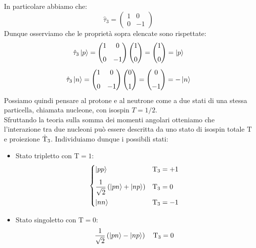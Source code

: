 In particolare abbiamo che:
\begin{equation}
 \hat{\tau}_3 = \begin{pmatrix}
  1 & 0 \\[8pt]
  0 & -1
  \end{pmatrix}
\end{equation}
Dunque osserviamo che le proprietà sopra elencate sono rispettate:
\begin{equation}
  \hat{\tau}_3 \ket{p} = \begin{pmatrix}
  1 & 0 \\[8pt]
  0 & -1
  \end{pmatrix} \begin{pmatrix}
  1 \\[8pt]
  0
  \end{pmatrix} = \begin{pmatrix}
  1 \\[8pt]
  0
  \end{pmatrix} = \ket{p}
\end{equation}
\begin{equation}
  \hat{\tau}_3 \ket{n} = \begin{pmatrix}
  1 & 0 \\[8pt]
  0 & -1
  \end{pmatrix} \begin{pmatrix}
  0 \\[8pt]
  1
  \end{pmatrix} = \begin{pmatrix}
  0 \\[8pt]
  -1
  \end{pmatrix} = -\ket{n}
\end{equation}
Possiamo quindi pensare al protone e al neutrone come a due stati di una stessa particella, chiamata nucleone, con isospin $T=1/2$.\\
Sfruttando la teoria sulla somma dei momenti angolari otteniamo che l'interazione tra due nucleoni può essere descritta da uno stato di isospin totale $\text{T}$ e proiezione $\hat{\text{T}}_3$. Individuiamo dunque i possibili stati:
\begin{itemize}
 \item Stato tripletto con $\text{T}=1$:
 \begin{equation}
  \begin{cases}
   \ket{pp} & \text{T}_3 = +1 \\[8pt]
   \dfrac{1}{\sqrt{2}}\left(\ket{pn} + \ket{np}\right) & \text{T}_3 = 0 \\[8pt]
   \ket{nn} & \text{T}_3 = -1
  \end{cases}
 \end{equation}
 \item Stato singoletto con $\text{T}=0$:
 \begin{equation}
  \dfrac{1}{\sqrt{2}}\left(\ket{pn} - \ket{np}\right) \quad \text{T}_3 = 0
 \end{equation}
\end{itemize}

